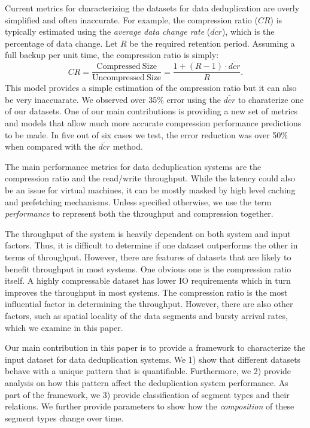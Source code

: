 Current metrics for characterizing the datasets for data deduplication are overly simplified and often inaccurate. For example, the compression ratio ($\mathit{CR}$) is typically estimated using the \emph{average data change rate} ($\overline{\mathit{dcr}}$), which is the percentage of data change. Let $R$ be the required retention period. Assuming a full backup per unit time, the compression ratio is simply: 
\begin{equation}\label{dcr_est}
\mathit{CR}= \frac{\mathrm{Compressed\ Size}}{\mathrm{Uncompressed\ Size}}=\frac{1+(R-1)\cdot \overline{\mathit{dcr}}}{R}. 
\end{equation}
This model provides a simple estimation of the ompression ratio but it can also be very inaccuarate. We observed over 35\% error using the $\overline{\mathit{dcr}}$ to charaterize one of our datasets. One of our main contributions is providing a new set of metrics and models that allow much more accurate compression performance predictions to be made. In five out of six cases we test, the error reduction was over 50\% when compared with the $\overline{\mathit{dcr}}$ method.  

The main performance metrics for data deduplication systems are the compression ratio and the read/write throughput. While the latency could also be an issue for virtual machines, it can be mostly masked by high level caching and prefetching mechanisms. Unless specified otherwise, we use the term \emph{performance} to represent both the throughput and compression together. 

The throughput of the system is heavily dependent on both system and input factors. Thus, it is difficult to determine if one dataset outperforms the other in terms of throughput. However, there are features of datasets that are likely to benefit throughput in most systems. One obvious one is the compression ratio itself. A highly compressable dataset has lower IO requirements which in turn improves the throughput in most systems. The compression ratio is the most influential factor in determining the throughput. However, there are also other factors, such as spatial locality of the data segments and bursty arrival rates, which we examine in this paper. 

Our main contribution in this paper is to provide a framework to characterize the input dataset for data deduplication systems. We 1) show that different datasets behave with a unique pattern that is quantifiable. Furthermore, we 2) provide analysis on how this pattern affect the deduplication system performance. As part of the framework, we 3) provide classification of segment types and their relations. We further provide parameters to show how the \emph{composition} of these segment types change over time. 

